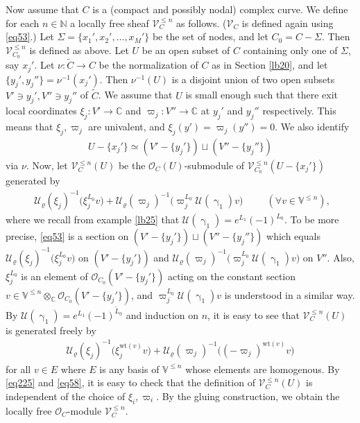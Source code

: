 \documentclass[12pt,a4paper,notitlepage]{report}
\theoremstyle{definition}
\theoremstyle{plain}
\newcommand{\mc}{\mathcal}
\newcommand{\wtd}{\widetilde}
\newcommand{\scr}{\mathscr}
\newcommand{\mbb}{\mathbb}
\newcommand{\Vbb}{\mathbb V}
\newcommand{\Cbb}{\mathbb C}
\newcommand{\Nbb}{\mathbb N}
\newcommand{\wt}{\mathrm{wt}}
\numberwithin{equation}{section}
\begin{document}
Now assume that $C$ is a (compact and possibly nodal) complex curve. We define for each $n\in\Nbb$ a locally free sheaf $\scr V_C^{\leq n}$ as follows. ($\scr V_C$ is defined again using \eqref{eq53}.) Let $\Sigma=\{x_1',x_2',\dots,x_M'\}$ be the set of nodes, and let $C_0=C-\Sigma$. Then $\scr V_{C_0}^{\leq n}$ is defined as above. Let $U$ be an open subset of $C$ containing only one of $\Sigma$, say $x_j'$. Let $\nu:\wtd C\rightarrow C$ be the normalization of $C$ as in Section \ref{lb20}, and let $\{y_j',y_j''\}=\nu^{-1}(x_j')$. Then $\nu^{-1}(U)$ is a disjoint union of two open subsets $V'\ni y_j',V''\ni y_j''$ of $\wtd C$. We assume that $U$ is small enough such that there exit local coordinates $\xi_j:V'\rightarrow\mbb C$ and $\varpi_j:V''\rightarrow\mbb C$ at $y_j'$ and $y_j''$ respectively. This means that $\xi_j,\varpi_j$ are univalent, and $\xi_j(y')=\varpi_j(y'')=0$. We also identify
\begin{align}
U-\{x_j'\} \simeq (V'-\{y_j'\})\sqcup (V''-\{y_j''\})
\end{align}
via $\nu$. Now, let $\scr V_C^{\leq n}(U)$ be the $\scr O_C(U)$-submodule of $\scr V_{C_0}^{\leq n}(U-\{x_j'\})$ generated by
\begin{align}
\boxed{~~\mc U_\varrho(\xi_j)^{-1}\big(\xi_j^{L_0}v\big)+\mc U_\varrho(\varpi_j)^{-1}\big(\varpi_j^{L_0}\mc U(\upgamma_1)v\big)~~}\qquad (\forall v\in\Vbb^{\leq n}),\label{eq54}
\end{align}
where we recall from example \ref{lb25} that $\mc U(\upgamma_1)=e^{L_1}(-1)^{L_0}$. To be more precise, \eqref{eq53} is a section on $(V'-\{y_j'\})\sqcup (V''-\{y_j''\})$ which equals $\mc U_\varrho(\xi_j)^{-1}\big(\xi_j^{L_0}v\big)$ on $(V'-\{y_j'\})$ and $\mc U_\varrho(\varpi_j)^{-1}\big(\varpi_j^{L_0}\mc U(\upgamma_1)v\big)$ on $V''$. Also, $\xi_j^{L_0}$ is an element of $\scr O_{C_0}(V'-\{y_j'\})$ acting on the constant section $v\in\Vbb^{\leq n}\otimes_{\Cbb}\scr O_{C_0}(V'-\{y_j'\})$, and $\varpi_j^{L_0}\mc U(\upgamma_1)v$ is understood in a similar way.  By $\mc U(\upgamma_1)=e^{L_1}(-1)^{\wtd L_0}$ and induction on $n$, it is easy to see that $\scr V_C^{\leq n}(U)$ is generated freely by
\begin{align}
\mc U_\varrho(\xi_j)^{-1}\big(\xi_j^{\wt (v)}v\big)+\mc U_\varrho(\varpi_j)^{-1}\big((-\varpi_j)^{\wt(v)}v\big)\label{eq225}
\end{align}
for all $v\in E$ where $E$ is any basis of $\Vbb^{\leq n}$ whose elements are homogenous. By \eqref{eq225} and \eqref{eq58}, it is easy to check that the definition of $\scr V_C^{\leq n}(U)$ is independent of the choice of $\xi_i,\varpi_i$. By the gluing construction, we obtain the locally free $\scr O_C$-module $\scr V_C^{\leq n}$.
\end{document}
